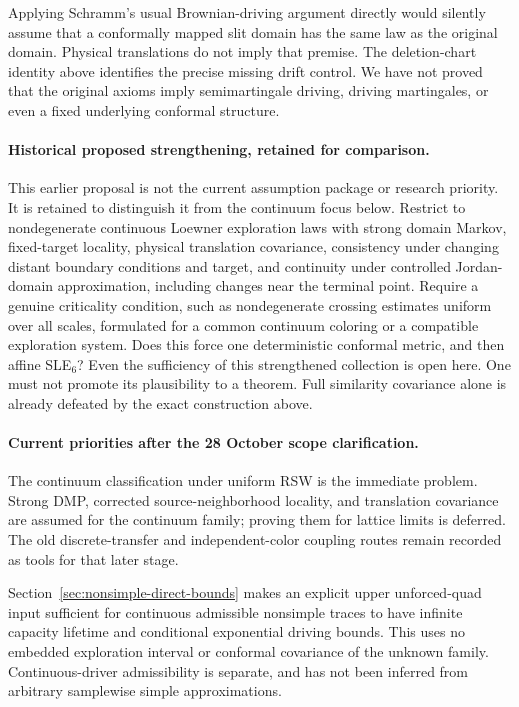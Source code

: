 \documentclass[11pt]{article}
\theoremstyle{definition}\newtheorem{definition}[theorem]{Definition}
\theoremstyle{remark}\newtheorem{remark}[theorem]{Remark}
\begin{document}
Applying Schramm's usual Brownian-driving argument directly would silently
assume that a conformally mapped slit domain has the same law as the original
domain. Physical translations do not imply that premise. The deletion-chart
identity above identifies the precise missing drift control. We have not
proved that the original axioms imply semimartingale driving, driving
martingales, or even a fixed underlying conformal structure.

\paragraph{Historical proposed strengthening, retained for comparison.}
This earlier proposal is not the current assumption package or research
priority. It is retained to distinguish it from the continuum focus below.
Restrict to nondegenerate continuous Loewner exploration laws with strong
domain Markov, fixed-target locality, physical translation covariance,
consistency under changing distant boundary conditions and target, and
continuity under controlled Jordan-domain approximation, including changes
near the terminal point. Require a genuine criticality condition, such as
nondegenerate crossing estimates uniform over all scales, formulated for a
common continuum coloring or a compatible exploration system. Does this
force one deterministic conformal metric, and then affine SLE$_6$?
Even the sufficiency of this strengthened collection is open here. One must
not promote its plausibility to a theorem. Full similarity covariance alone
is already defeated by the exact construction above.

\paragraph{Current priorities after the 28 October scope clarification.}
The continuum classification under uniform RSW is the immediate problem.
Strong DMP, corrected source-neighborhood locality, and translation
covariance are assumed for the continuum family; proving them for lattice
limits is deferred. The old discrete-transfer and independent-color
coupling routes remain recorded as tools for that later stage.

Section~\ref{sec:nonsimple-direct-bounds} makes an explicit upper
unforced-quad input sufficient for continuous admissible nonsimple traces
to have infinite capacity lifetime and conditional exponential driving
bounds. This uses no embedded exploration interval or conformal covariance
of the unknown family. Continuous-driver admissibility is separate, and
has not been inferred from arbitrary samplewise simple approximations.
\end{document}
